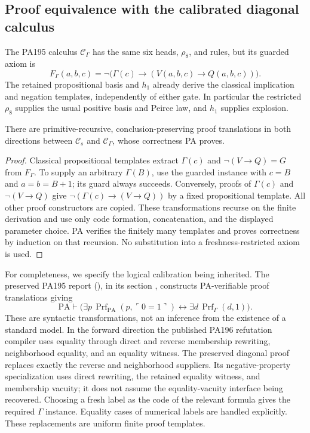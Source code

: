 \subsection{Proof equivalence with the calibrated diagonal calculus}

The PA195 calculus $\mathcal C_\Gamma$ has the same six heads,
$\rho_8$, and rules, but its guarded axiom is
\[
 F_\Gamma(a,b,c)=
       \neg\bigl(\Gamma(c)\to(V(a,b,c)\to Q(a,b,c))\bigr).
\]
The retained propositional basis and $h_1$ already derive the
classical implication and negation templates, independently of either
gate. In particular the restricted $\rho_8$ supplies the usual
positive basis and Peirce law, and $h_1$ supplies explosion.

\begin{lemma}\label{lem:pa194-calculi}
There are primitive-recursive, conclusion-preserving proof
translations in both directions between $\mathcal C_s$ and
$\mathcal C_\Gamma$, whose correctness PA proves.
\end{lemma}
\begin{proof}
Classical propositional templates extract $\Gamma(c)$ and
$\neg(V\to Q)=G$ from $F_\Gamma$. To supply an arbitrary
$\Gamma(B)$, use the guarded instance with $c=B$ and
$a=b=B+1$; its guard always succeeds. Conversely, proofs of
$\Gamma(c)$ and $\neg(V\to Q)$ give
$\neg(\Gamma(c)\to(V\to Q))$ by a fixed propositional template.
All other proof constructors are copied. These transformations recurse
on the finite derivation and use only code formation, concatenation,
and the displayed parameter choice. PA verifies the finitely many
templates and proves correctness by induction on that recursion.
No substitution into a freshness-restricted axiom is used.
\end{proof}

For completeness, we specify the logical calibration being inherited.
The preserved PA195 report (), in its
section , constructs PA-verifiable proof
translations giving
\begin{equation}\label{eq:pa194-proofcalibration}
 \mathrm{PA}\vdash
 \bigl(\exists p\,\operatorname{Prf}_{\mathrm{PA}}
                  (p,\ulcorner0=1\urcorner)
       \leftrightarrow
       \exists d\,\operatorname{Prf}_{\Gamma}(d,1)\bigr).
\end{equation}
These are syntactic transformations, not an inference from the
existence of a standard model. In the forward direction the published
PA196 refutation compiler uses equality through direct and reverse
membership rewriting, neighborhood equality, and an equality witness.
The preserved diagonal proof replaces exactly the reverse and
neighborhood suppliers. Its negative-property specialization uses
direct rewriting, the retained equality witness, and membership
vacuity; it does not assume the equality-vacuity interface being
recovered. Choosing a fresh label as the code of the relevant formula
gives the required $\Gamma$ instance. Equality cases of numerical
labels are handled explicitly. These replacements are uniform finite
proof templates.

